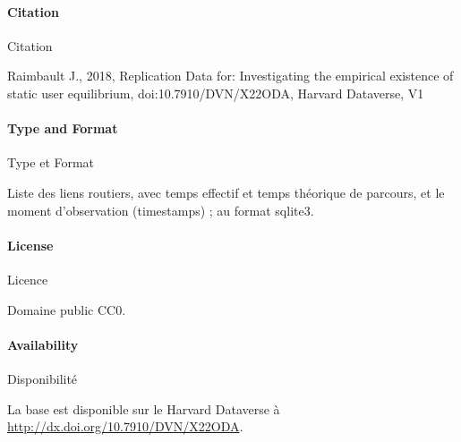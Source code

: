 \paragraph{Citation}{Citation}

Raimbault J., 2018, Replication Data for: Investigating the empirical existence of static user equilibrium, doi:10.7910/DVN/X22ODA, Harvard Dataverse, V1


\paragraph{Type and Format}{Type et Format}

Liste des liens routiers, avec temps effectif et temps théorique de parcours, et le moment d'observation (timestamps) ; au format sqlite3.

\paragraph{License}{Licence}

Domaine public CC0.

\paragraph{Availability}{Disponibilité}

La base est disponible sur le Harvard Dataverse à \url{http://dx.doi.org/10.7910/DVN/X22ODA}.












